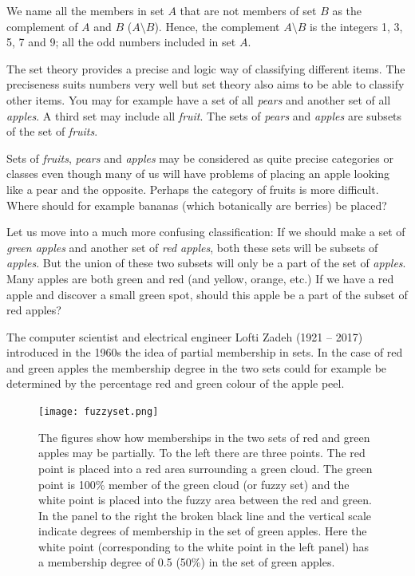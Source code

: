 \documentclass[11pt,fleqn]{book} %
\begin{document}
We name all the members in set $A$ that are not members of set $B$ as the complement of $A$ and $B$ ($A \setminus B$). Hence, the complement $A \setminus B$ is the integers 1, 3, 5, 7 and 9; all the odd numbers included in set $A$.

The set theory provides a precise and logic way of classifying different items. The preciseness suits numbers very well but set theory also aims to be able to classify other items. You may for example have a set of all \textit{pears} and another set of all \textit{apples}. A third set may include all \textit{fruit}. The sets of \textit{pears} and \textit{apples} are subsets of the set of \textit{fruits}.

Sets of \textit{fruits}, \textit{pears} and \textit{apples} may be considered as quite precise categories or classes even though many of us will have problems of placing an apple looking like a pear and the opposite. Perhaps the category of fruits is more difficult. Where should for example bananas (which botanically are berries) be placed?

Let us move into a much more confusing classification: If we should make a set of \textit{green apples} and another set of \textit{red apples}, both these sets will be subsets of \textit{apples}. But the union of these two subsets will only be a part of the set of \textit{apples}. Many apples are both green and red (and yellow, orange, etc.) If we have a red apple and discover a small green spot, should this apple be a part of the subset of red apples?

The computer scientist and electrical engineer Lofti Zadeh (1921 -- 2017) introduced in the 1960s the idea of partial membership in sets. In the case of red and green apples the membership degree in the two sets could for example be determined by the percentage red and green colour of the apple peel.
\begin{figure}[ht]
\centering
\texttt{[image: fuzzyset.png]}
\caption{The figures show how memberships in the two sets of red and green apples may be partially. To the left there are three points. The red point is placed into a red area surrounding a green cloud. The green point is 100\% member of the green cloud (or fuzzy set) and the white point is placed into the fuzzy area between the red and green. In the panel to the right the broken black line and the vertical scale indicate degrees of membership in the set of green apples. Here the white point (corresponding to the white point in the left panel) has a membership degree of 0.5 (50\%) in the set of green apples.}
\label{fig:fuzzyset}
\end{figure}
\end{document}
